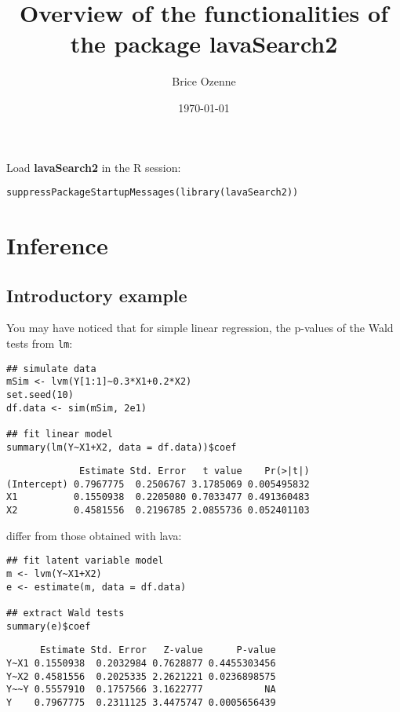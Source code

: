 \documentclass[12pt]{article}
\author{Brice Ozenne}
\date{\today}
\title{Overview of the functionalities of the package lavaSearch2}
\begin{document}
\maketitle
Load \textbf{lavaSearch2} in the R session:
\lstset{language=r,label= ,caption= ,captionpos=b,numbers=none}
\begin{lstlisting}
suppressPackageStartupMessages(library(lavaSearch2))
\end{lstlisting}

\section{Inference}
\label{sec:orgb5367e6}
\subsection{Introductory example}
\label{sec:orgd9de530}
You may have noticed that for simple linear regression, the p-values
of the Wald tests from \texttt{lm}:
\lstset{language=r,label= ,caption= ,captionpos=b,numbers=none}
\begin{lstlisting}
## simulate data
mSim <- lvm(Y[1:1]~0.3*X1+0.2*X2)
set.seed(10)
df.data <- sim(mSim, 2e1)

## fit linear model
summary(lm(Y~X1+X2, data = df.data))$coef
\end{lstlisting}

\begin{verbatim}
             Estimate Std. Error   t value    Pr(>|t|)
(Intercept) 0.7967775  0.2506767 3.1785069 0.005495832
X1          0.1550938  0.2205080 0.7033477 0.491360483
X2          0.4581556  0.2196785 2.0855736 0.052401103
\end{verbatim}

differ from those obtained with lava:
\lstset{language=r,label= ,caption= ,captionpos=b,numbers=none}
\begin{lstlisting}
## fit latent variable model
m <- lvm(Y~X1+X2)
e <- estimate(m, data = df.data)

## extract Wald tests
summary(e)$coef
\end{lstlisting}

\begin{verbatim}
      Estimate Std. Error   Z-value      P-value
Y~X1 0.1550938  0.2032984 0.7628877 0.4455303456
Y~X2 0.4581556  0.2025335 2.2621221 0.0236898575
Y~~Y 0.5557910  0.1757566 3.1622777           NA
Y    0.7967775  0.2311125 3.4475747 0.0005656439
\end{verbatim}
\end{document}
